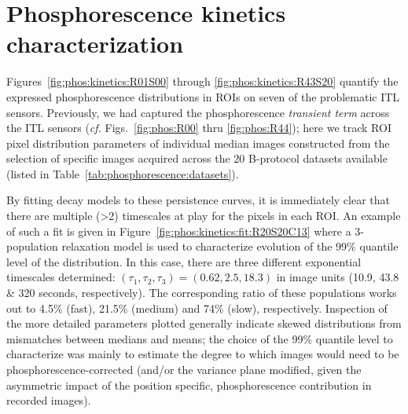 \section{Phosphorescence kinetics characterization}
\label{sect:kinetics}
Figures~\ref{fig:phos:kinetics:R01S00} through \ref{fig:phos:kinetics:R43S20} quantify the expressed phosphorescence distributions in ROIs on seven of the problematic ITL sensors. Previously, we had captured the phosphorescence {\it transient term} across the ITL sensors ({\it cf.} Figs.~\ref{fig:phos:R00} thru \ref{fig:phos:R44}); here we track ROI pixel distribution parameters of individual median images constructed from the selection of specific images acquired across the 20 B-protocol datasets available (listed in Table~\ref{tab:phosphorescence:datasets}). 

By fitting decay models to these persistence curves, it is immediately clear that there are multiple (>2) timescales at play for the pixels in each ROI. An example of such a fit is given in Figure~\ref{fig:phos:kinetics:fit:R20S20C13} where a 3-population relaxation model is used to characterize evolution of the 99\% quantile level of the distribution. In this case, there are three different exponential timescales determined: $(\tau_1,\tau_2,\tau_3) = (0.62,2.5,18.3)$ in image units (10.9, 43.8 \& 320 seconds, respectively). The corresponding ratio of these populations works out to 4.5\% (fast), 21.5\% (medium) and 74\% (slow), respectively. Inspection of the more detailed parameters plotted generally indicate skewed distributions from mismatches between medians and means; the choice of the 99\% quantile level to characterize was mainly to estimate the degree to which images would need to be phosphorescence-corrected (and/or the variance plane modified, given the asymmetric impact of the position specific, phosphorescence contribution in recorded images). 

